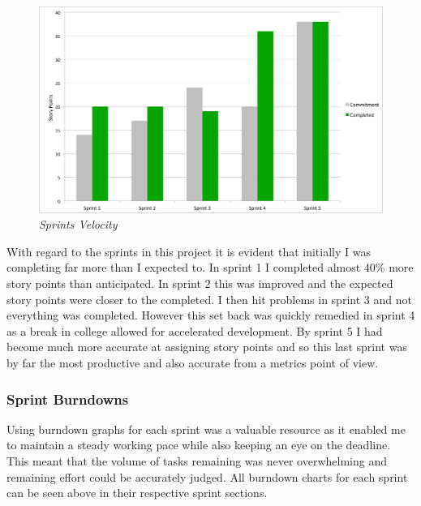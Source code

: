 \begin{figure}[!ht]
\centering
\includegraphics*[width=\textwidth]{images/velocity2}
\caption{\em Sprints Velocity}
\label{fig:velocity}
\end{figure}

With regard to the \glspl{sprint} in this project it is evident that initially I was completing far more than I expected to. In sprint 1 I completed almost 40\% more story points than anticipated. In sprint 2 this was improved and the expected story points were closer to the completed. I then hit problems in sprint 3 and not everything was completed. However this set back was quickly remedied in sprint 4 as a break in college allowed for accelerated development. By sprint 5 I had become much more accurate at assigning story points and so this last sprint was by far the most productive and also accurate from a metrics point of view.

\subsubsection{Sprint Burndowns}

Using burndown graphs for each sprint was a valuable resource as it enabled me to maintain a steady working pace while also keeping an eye on the deadline. This meant that the volume of tasks remaining was never overwhelming and remaining effort could be accurately judged. All burndown charts for each sprint can be seen above in their respective sprint sections.
